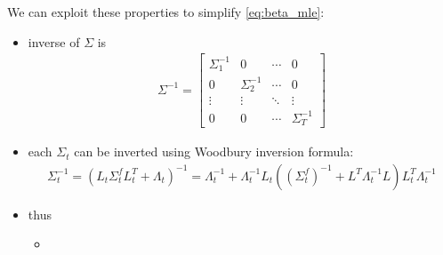 We can exploit these properties to simplify \autoref{eq:beta_mle}:
\begin{itemize}
	\item inverse of $\Sigma$ is
\begin{align}
\Sigma^{-1} = \begin{bmatrix}
	\Sigma_1^{-1} & 0 & \cdots & 0 \\
	0 & \Sigma_2^{-1} & \cdots & 0 \\
	\vdots & \vdots & \ddots & \vdots \\
	0 & 0 & \cdots & \Sigma_T^{-1}
\end{bmatrix}
\end{align}
\item each $\Sigma_t$ can be inverted using Woodbury inversion formula:
\begin{align}
	\Sigma_t^{-1} = (L_t \Sigma^f_t L_t^T + \Lambda_t)^{-1} = \Lambda_t^{-1} + \Lambda_t^{-1} L_t ((\Sigma^f_t) ^ {-1} + L^T \Lambda_t^{-1} L ) L_t^T \Lambda_t^{-1}
\end{align}
 \item thus
 \begin{itemize}
 	\item 
 \end{itemize}

\end{itemize}

